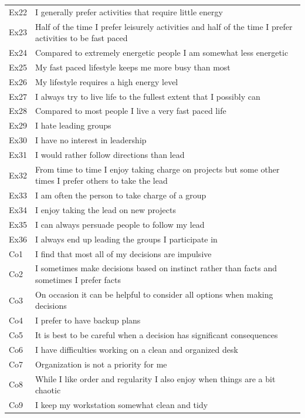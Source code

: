\documentclass[man]{apa6}
\begin{document}
\begin{longtable}{ll}
Ex22 & I generally prefer activities that require little energy\\
Ex23 & Half of the time I prefer leisurely activities and half of the time I prefer activities to be fast paced\\
Ex24 & Compared to extremely energetic people  I am somewhat less energetic\\
Ex25 & My fast paced lifestyle keeps me more busy than most\\
\addlinespace
Ex26 & My lifestyle requires a high energy level\\
Ex27 & I always try to live life to the fullest extent that I possibly can\\
Ex28 & Compared to most people  I live a very fast paced life\\
Ex29 & I hate leading groups\\
Ex30 & I have no interest in leadership\\
\addlinespace
Ex31 & I would rather follow directions than lead\\
Ex32 & From time to time  I enjoy taking charge on projects  but some other times I prefer others to take the lead\\
Ex33 & I am often the person to take charge of a group\\
Ex34 & I enjoy taking the lead on new projects\\
Ex35 & I can always persuade people to follow my lead\\
\addlinespace
Ex36 & I always end up leading the groups I participate in\\
Co1 & I find that most all of my decisions are impulsive\\
Co2 & I sometimes make decisions based on instinct rather than facts  and sometimes I prefer facts\\
Co3 & On occasion it can be helpful to consider all options when making decisions\\
Co4 & I prefer to have backup plans\\
\addlinespace
Co5 & It is best to be careful when a decision has significant consequences\\
Co6 & I have difficulties working on a clean and organized desk\\
Co7 & Organization is not a priority for me\\
Co8 & While I like order and regularity  I also enjoy when things are a bit chaotic\\
Co9 & I keep my workstation somewhat clean and tidy\\

\end{longtable}
\end{document}
